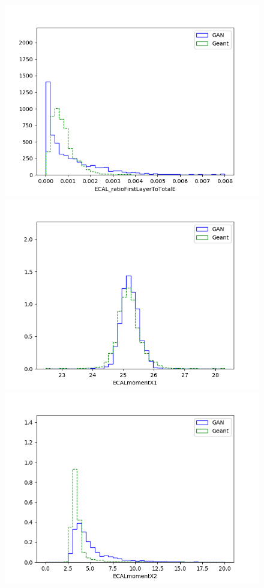 \begin{figure}
    \includegraphics[scale=0.3]{Images/Calo/GAN_feature_ECAL_ratioFirstLayerToTotalE.png}
    \includegraphics[scale=0.3]{Images/Calo/GAN_feature_ECALmomentX1.png}
    \includegraphics[scale=0.3]{Images/Calo/GAN_feature_ECALmomentX2.png}

\end{figure}
